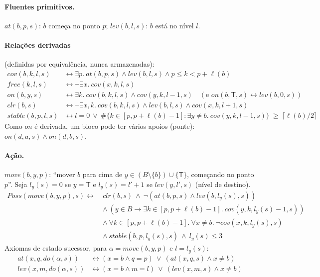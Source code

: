 \documentclass[11pt,a4paper]{article}
\newcommand{\at}{\mathit{at}}\newcommand{\lev}{\mathit{lev}}\newcommand{\clr}{\mathit{clr}}
\newcommand{\cov}{\mathit{cov}}\newcommand{\len}{\ell}\newcommand{\mv}{\mathit{move}}
\newcommand{\Tm}{\mathsf{T}}
\begin{document}
\paragraph{Fluentes primitivos.}
$\at(b,p,s)$: $b$ começa no ponto $p$; $\lev(b,l,s)$: $b$ está no nível $l$.

\paragraph{Relações derivadas} (definidas por equivalência, nunca armazenadas):
\begin{align*}
\cov(b,k,l,s) &\leftrightarrow \exists p.\ \at(b,p,s)\wedge\lev(b,l,s)\wedge p\le k<p+\len(b)\\
\mathit{free}(k,l,s) &\leftrightarrow \neg\exists x.\ \cov(x,k,l,s)\\
\mathit{on}(b,y,s) &\leftrightarrow \exists k.\ \cov(b,k,l,s)\wedge\cov(y,k,l-1,s)\quad(\text{e }\mathit{on}(b,\Tm,s)\leftrightarrow\lev(b,0,s))\\
\clr(b,s) &\leftrightarrow \neg\exists x,k.\ \cov(b,k,l,s)\wedge\lev(b,l,s)\wedge\cov(x,k,l+1,s)\\
\mathit{stable}(b,p,l,s) &\leftrightarrow l=0\ \vee\ \#\{k\in[p,p+\len(b)-1]:\exists y\neq b.\ \cov(y,k,l-1,s)\}\ \ge\ \lceil\len(b)/2\rceil
\end{align*}
Como $\mathit{on}$ é derivada, um bloco pode ter vários apoios (ponte): $\mathit{on}(d,a,s)\wedge\mathit{on}(d,b,s)$.

\paragraph{Ação.} $\mv(b,y,p)$: ``mover $b$ para cima de $y\in(B\setminus\{b\})\cup\{\Tm\}$, começando no ponto $p$''.
Seja $l_y(s)=0$ se $y=\Tm$ e $l_y(s)=l'+1$ se $\lev(y,l',s)$ (nível de destino).
\begin{align*}
Poss(\mv(b,y,p),s)\leftrightarrow\ & \clr(b,s)\ \wedge\ \neg(\at(b,p,s)\wedge\lev(b,l_y(s),s))\\
&\wedge\ (y\in B\to\exists k\in[p,p+\len(b)-1].\ \cov(y,k,l_y(s)-1,s))\\
&\wedge\ \forall k\in[p,p+\len(b)-1].\ \forall x\neq b.\ \neg\cov(x,k,l_y(s),s)\\
&\wedge\ \mathit{stable}(b,p,l_y(s),s)\ \wedge\ l_y(s)\le 3
\end{align*}
Axiomas de estado sucessor, para $\alpha=\mv(b,y,p)$ e $l=l_y(s)$:
\begin{align*}
\at(x,q,do(\alpha,s))&\leftrightarrow (x=b\wedge q=p)\ \vee\ (\at(x,q,s)\wedge x\neq b)\\
\lev(x,m,do(\alpha,s))&\leftrightarrow (x=b\wedge m=l)\ \vee\ (\lev(x,m,s)\wedge x\neq b)
\end{align*}
\end{document}
